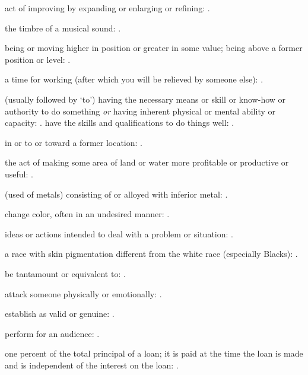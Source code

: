   act of improving by expanding or enlarging or refining: .

  the timbre of a musical sound:   .

  being or moving higher in position or greater in some value; being above a former position or level: .

  a time for working (after which you will be relieved by someone else):   .

  (usually followed by `to') having the necessary means or skill or know-how or authority to do something \textit{or} having inherent physical or mental ability or capacity: . have the skills and qualifications to do things well:   .

  in or to or toward a former location: .

  the act of making some area of land or water more profitable or productive or useful:   .

  (used of metals) consisting of or alloyed with inferior metal: .

  change color, often in an undesired manner:   .

  ideas or actions intended to deal with a problem or situation:   .

  a race with skin pigmentation different from the white race (especially Blacks):   .

  be tantamount or equivalent to: .

  attack someone physically or emotionally:   .

  establish as valid or genuine:   .

  perform for an audience: .

  one percent of the total principal of a loan; it is paid at the time the loan is made and is independent of the interest on the loan: .

